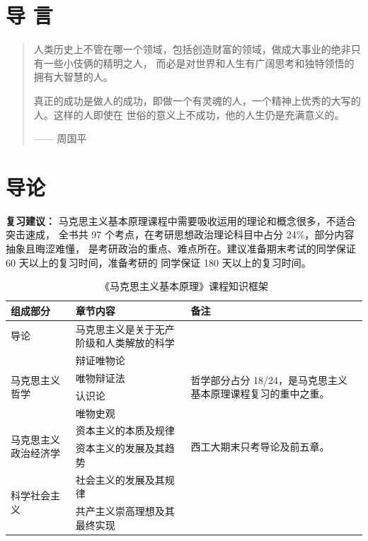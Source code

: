 \documentclass[10pt, UTF8]{book} %
\begin{document}
\makeatletter
\let\ps@plain\ps@empty
\makeatother


\newpage
\chapter*{导 \quad 言}

\begin{quote}
    人类历史上不管在哪一个领域，包括创造财富的领域，做成大事业的绝非只有一些小伎俩的精明之人，
    而必是对世界和人生有广阔思考和独特领悟的拥有大智慧的人。
    
    真正的成功是做人的成功，即做一个有灵魂的人，一个精神上优秀的大写的人。这样的人即使在
    世俗的意义上不成功，他的人生仍是充满意义的。
    
    \begin{flushright}
        \kaishu —— 周国平
    \end{flushright}
\end{quote}

\newpage
\thispagestyle{empty}

\chapter{导论}

{\heiti\bfseries 复习建议：}
马克思主义基本原理课程中需要吸收运用的理论和概念很多，不适合突击速成，
全书共 97 个考点，在考研思想政治理论科目中占分 24\%，部分内容抽象且晦涩难懂，
是考研政治的重点、难点所在。建议准备期末考试的同学保证 60 天以上的复习时间，准备考研的
同学保证 180 天以上的复习时间。

\begin{table}[H]
    \small
    \centering
    \caption{《马克思主义基本原理》课程知识框架}
    \begin{tabular}{p{}|p{}|p{}}
        \hline
        \textbf{组成部分} & \textbf{章节内容} & \textbf{备注} \\
        \hline 
        导论 & 马克思主义是关于无产阶级和人类解放的科学 \\ 
        \hline
        \multirow{4}{0.2\textwidth}{马克思主义哲学} 
        & 辩证唯物论 & \multirow{4}{0.3\textwidth}{哲学部分占分 18/24，是马克思主义基本原理课程复习的重中之重。} \\
        & 唯物辩证法 & \\
        & 认识论 & \\
        & 唯物史观 & \\
        \hline 
        \multirow{2}{0.2\textwidth}{马克思主义政治经济学}
        & 资本主义的本质及规律 
        & \multirow{2}{0.3\textwidth}{西工大期末只考导论及前五章。} \\ 
        & 资本主义的发展及其趋势 & \\ 
        \hline 
        \multirow{2}{0.2\textwidth}{科学社会主义}
        & 社会主义的发展及其规律 & \\ 
        & 共产主义崇高理想及其最终实现 & \\ 
        \hline
    \end{tabular}
\end{table}
\end{document}
